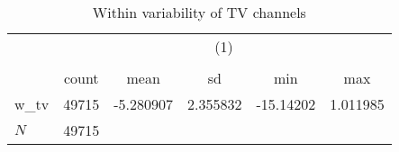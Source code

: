\begin{table}[htbp]\centering
\def\sym#1{\ifmmode^{#1}\else\(^{#1}\)\fi}
\caption{Within variability of TV channels\label{tab1}}
\begin{tabular}{l*{1}{ccccc}}
\hline\hline
            &\multicolumn{5}{c}{(1)}                                         \\
            &\multicolumn{5}{c}{}                                            \\
            &       count&        mean&          sd&         min&         max\\
\hline
w\_tv        &       49715&   -5.280907&    2.355832&   -15.14202&    1.011985\\
\hline
\(N\)       &       49715&            &            &            &            \\
\hline\hline
\end{tabular}
\end{table}
